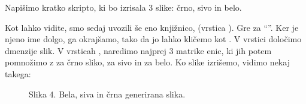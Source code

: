 \documentclass[letterpaper,10pt,english]{sphinxmanual}
\begin{document}
\sphinxAtStartPar
Napišimo kratko skripto, ki bo izrisala 3 slike: črno, sivo in belo.

\begin{sphinxVerbatim}[commandchars=\\\{\},numbers=left,firstnumber=1,stepnumber=1]
   
 

  \PYG{p}{[}\PYG{p}{]}

   
   
   

 
 
 

\end{sphinxVerbatim}

\sphinxAtStartPar
Kot lahko vidite, smo sedaj uvozili še eno knjižnico,  (vrstica ). Gre za “”. Ker je njeno ime dolgo, ga okrajšamo, tako da jo lahko kličemo kot .
V vrstici  določimo dmenzije slik. V vrsticah , naredimo najprej 3 matrike enic, ki jih potem pomnožimo z  za črno sliko,  za sivo in  za belo. Ko slike izrišemo, vidimo nekaj takega:

\begin{figure}[htbp]
\centering
\capstart

\noindent{}
\caption{Slika 4. Bela, siva in črna generirana slika.}\label{\detokenize{uvod_py_opencv:id5}}\end{figure}
\end{document}
